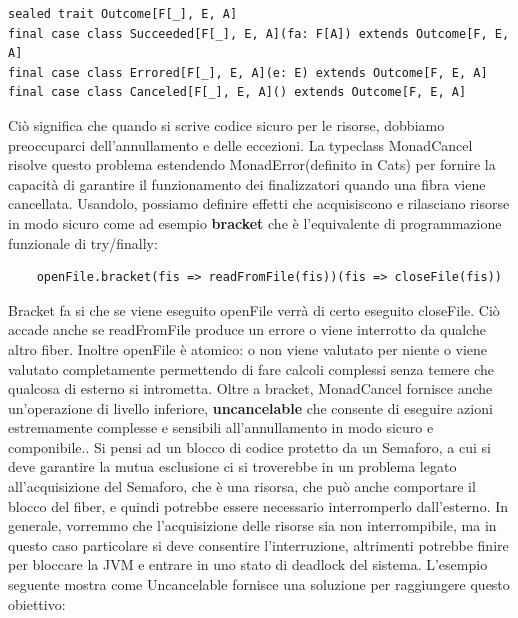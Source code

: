 \begin{verbatim}
sealed trait Outcome[F[_], E, A]
final case class Succeeded[F[_], E, A](fa: F[A]) extends Outcome[F, E, A]
final case class Errored[F[_], E, A](e: E) extends Outcome[F, E, A]
final case class Canceled[F[_], E, A]() extends Outcome[F, E, A]    
\end{verbatim}

\noindent Ciò significa che quando si scrive codice sicuro per le risorse, dobbiamo preoccuparci dell'annullamento e delle eccezioni. La typeclass MonadCancel risolve questo problema estendendo MonadError(definito in Cats) per fornire la capacità di garantire il funzionamento dei finalizzatori quando una fibra viene cancellata. Usandolo, possiamo definire effetti che acquisiscono e rilasciano risorse in modo sicuro come ad esempio \textbf{bracket} che è l'equivalente di programmazione funzionale di try/finally:

\begin{verbatim}
    openFile.bracket(fis => readFromFile(fis))(fis => closeFile(fis))
\end{verbatim}

\noindent Bracket fa si che se viene eseguito openFile verrà di certo eseguito closeFile. Ciò accade anche se readFromFile produce un
errore o viene interrotto da qualche altro fiber. Inoltre openFile è atomico: o non viene valutato per niente o viene valutato 
completamente permettendo di fare calcoli complessi senza temere che qualcosa di esterno si intrometta. Oltre a bracket, MonadCancel fornisce anche un'operazione di livello inferiore, \textbf{uncancelable} che consente di eseguire azioni estremamente complesse e sensibili all'annullamento in modo sicuro e componibile.. Si pensi ad un blocco di codice protetto da un Semaforo, a cui si deve garantire la mutua esclusione ci si troverebbe in un problema legato all’acquisizione del Semaforo, che è una risorsa, che può anche comportare il blocco del fiber, e quindi potrebbe essere necessario interromperlo dall’esterno. In generale, vorremmo che l’acquisizione delle risorse sia non interrompibile, ma in questo caso particolare si deve consentire l’interruzione, altrimenti potrebbe finire per bloccare la JVM e entrare in uno stato di deadlock del sistema. L'esempio seguente mostra come Uncancelable fornisce una soluzione per raggiungere questo obiettivo:

